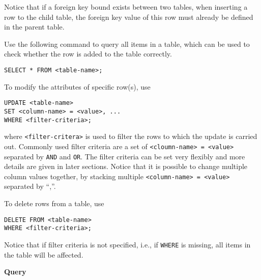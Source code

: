 Notice that if a foreign key bound exists between two tables, when inserting a row to the child table, the foreign key value of this row must already be defined in the parent table.

Use the following command to query all items in a table, which can be used to check whether the row is added to the table correctly.
\begin{lstlisting}
SELECT * FROM <table-name>;
\end{lstlisting}

To modify the attributes of specific row(s), use
\begin{lstlisting}
UPDATE <table-name>
SET <column-name> = <value>, ...
WHERE <filter-criteria>;
\end{lstlisting}
where \verb|<filter-critera>| is used to filter the rows to which the update is carried out. Commonly used filter criteria are a set of \verb|<cloumn-name> = <value>| separated by \verb|AND| and \verb|OR|. The filter criteria can be set very flexibly and more details are given in later sections. Notice that it is possible to change multiple column values together, by stacking multiple \verb|<column-name> = <value>| separated by ``,''.

To delete rows from a table, use
\begin{lstlisting}
DELETE FROM <table-name>
WHERE <filter-criteria>;
\end{lstlisting}

Notice that if filter criteria is not specified, i.e., if \verb|WHERE| is missing, all items in the table will be affected.

\vspace{0.1in}
\noindent \textbf{Query}
\vspace{0.1in}

